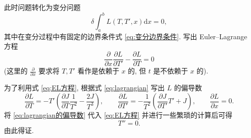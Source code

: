 \documentclass{article}
\begin{document}
\begin{enumerate}
此时问题转化为变分问题
\begin{equation}
	\delta\int_a^bL\left(T,T',x\right)\mathrm dx=0,
\end{equation}
其中在变分过程中有固定的边界条件式 \ref{eq:变分边界条件}.
写出 Euler--Lagrange 方程
\begin{equation}
	\frac{\partial}{\partial x}\frac{\partial L}{\partial T'}-\frac{\partial L}{\partial T}=0
	\label{eq:EL方程}
\end{equation}
(这里的 $\frac{\partial}{\partial x}$ 要求将 $T,T'$ 看作是依赖于 $x$ 的, 但 $t$ 是不依赖于 $x$ 的).

为了利用式 \ref{eq:EL方程}, 根据式 \ref{eq:lagrangian} 写出 $L$ 的偏导数
\begin{equation}
	\frac{\partial L}{\partial T}=-T'\left(\frac{\partial J}{\partial T}\frac1{T^2}-\frac{2J}{T^3}\right),
	\qquad\frac{\partial L}{\partial T'}=-\frac{1}{T^2}\left(\frac{\partial J}{\partial T'}T'+J\right),
	\qquad\frac{\partial L}{\partial x}=0.
	\label{eq:lagrangian的偏导数}
\end{equation}
将 \ref{eq:lagrangian的偏导数} 代入 \ref{eq:EL方程} 并进行一些繁琐的计算后可得
\begin{equation}
	T''=0.
\end{equation}
由此得证.

\end{enumerate}
\end{document}
